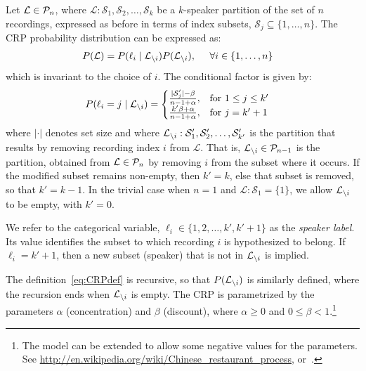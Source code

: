 \documentclass[a4paper,oneside,12pt,english]{report}
\def\Lset{\mathcal{L}}
\def\Sset{\mathcal{S}}
\begin{document}
Let $\Lset\in\Pset_n$, where $\Lset:\Sset_1,\Sset_2,\ldots,\Sset_k$ be a $k$-speaker partition of the set of $n$ recordings, expressed as before in terms of index subsets, $\Sset_j\subseteq\{1,\ldots,n\}$. The CRP probability distribution can be expressed as:  
\begin{align}
\label{eq:CRPdef}
P(\Lset) &= P(\ell_i\mid \Li)P(\Li), \;\;\;\;\;\forall i\in\{1,\ldots,n\}
\end{align}
which is invariant to the choice of $i$. The conditional factor is given by:
\begin{align}
\label{eq:CRP_recur}
P(\ell_i=j\mid \Li) &= \begin{cases}
\frac{\lvert\Sset'_j\rvert-\beta}{n-1+\alpha}, &\text{for $1\le j\le k'$}\\
\frac{k'\beta+\alpha}{n-1+\alpha}, &\text{for $j=k'+1$}
\end{cases}
\end{align}
where $\lvert\cdot\rvert$ denotes set size and where $\Li:\Sset'_1,\Sset'_2,\ldots,\Sset'_{k'}$ is the partition that results by removing recording index $i$ from $\Lset$. That is, $\Li\in\Pset_{n-1}$ is the partition, obtained from $\Lset\in\Pset_n$ by removing $i$ from the subset where it occurs. If the modified subset remains non-empty, then $k'=k$, else that subset is removed, so that $k'=k-1$. In the trivial case when $n=1$ and $\Lset:\Sset_1=\{1\}$, we allow $\Li$ to be empty, with $k'=0$.

We refer to the categorical variable, $\ell_i\in\{1,2,\ldots,k',k'+1\}$ as the \emph{speaker label}. Its value identifies the subset to which recording $i$ is hypothesized to belong. If $\ell_i=k'+1$, then a new subset (speaker) that is not in $\Li$ is implied. 

The definition~\eqref{eq:CRPdef} is recursive, so that $P(\Li)$ is similarly defined, where the recursion ends when $\Li$ is empty. The CRP is parametrized by the parameters $\alpha$ (concentration) and $\beta$ (discount), where $\alpha\ge0$ and $0\le\beta<1$.\footnote{The model can be extended to allow some negative values for the parameters. See \url{http://en.wikipedia.org/wiki/Chinese_restaurant_process}, or~\cite{PitmanBook}.} 
\end{document}
